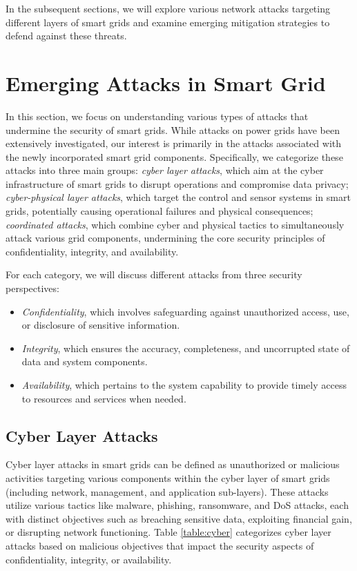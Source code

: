 \documentclass[10pt, journal]{IEEEtran}
\begin{document}
In the subsequent sections, we will explore various network attacks targeting different layers of smart grids and examine emerging mitigation strategies to defend against these threats.

\section{Emerging Attacks in Smart Grid}
\label{section:attack}

In this section, we focus on understanding various types of attacks that undermine the security of smart grids. While attacks on power grids have been extensively investigated, our interest is primarily in the attacks associated with the newly incorporated smart grid components. Specifically, we categorize these attacks into three main groups: {\it cyber layer attacks}, which aim at the cyber infrastructure of smart grids to disrupt operations and compromise data privacy; {\it cyber-physical layer attacks}, which target the control and sensor systems in smart grids, potentially causing operational failures and physical consequences; {\it coordinated attacks}, which combine cyber and physical tactics to simultaneously attack various grid components, undermining the core security principles of confidentiality, integrity, and availability. 
		
For each category, we will discuss different attacks from three security perspectives: 

\begin{itemize}

\item {\it Confidentiality}, which involves safeguarding against unauthorized access, use, or disclosure of sensitive information.

\item {\it Integrity}, which ensures the accuracy, completeness, and uncorrupted state of data and system components.

\item {\it Availability}, which pertains to the system capability to provide timely access to resources and services when needed. 

\end{itemize}


\subsection{Cyber Layer Attacks}

Cyber layer attacks in smart grids can be defined as unauthorized or malicious activities targeting various components within the cyber layer of smart grids (including network, management, and application sub-layers). These attacks utilize various tactics like malware, phishing, ransomware, and DoS attacks, each with distinct objectives such as breaching sensitive data, exploiting financial gain, or disrupting network functioning. Table \ref{table:cyber} categorizes cyber layer attacks based on malicious objectives that impact the security aspects of confidentiality, integrity, or availability.
\end{document}
